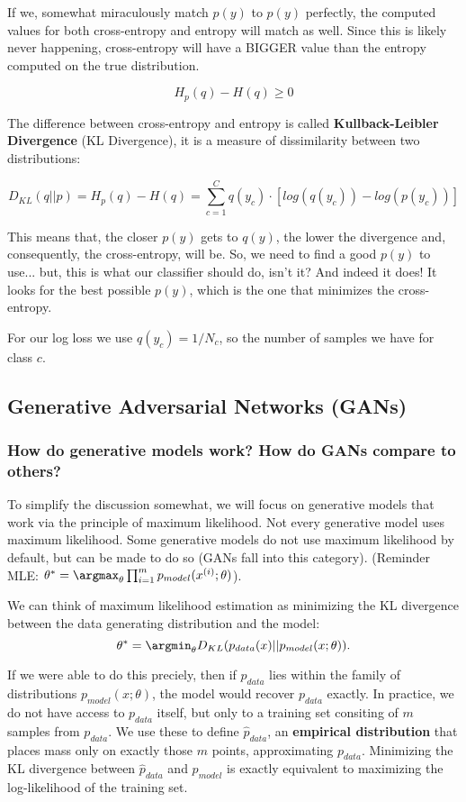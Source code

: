 If we, somewhat miraculously match $p(y)$ to $p(y)$ perfectly, the computed values for both cross-entropy and entropy will match as well. Since this is likely never happening, cross-entropy will have a BIGGER value than the entropy computed on the true distribution.

$$H_p(q) - H(q) \geq 0$$

The difference between cross-entropy and entropy is called \textbf{Kullback-Leibler Divergence} (KL Divergence), it is a measure of dissimilarity between two distributions:

$$D_{KL}(q||p) = H_p(q) - H(q) = \sum_{c=1}^C q(y_c) \cdot [log(q(y_c)) - log(p(y_c))]$$

This means that, the closer $p(y)$ gets to $q(y)$, the lower the divergence and, consequently, the cross-entropy, will be. So, we need to find a good $p(y)$ to use... but, this is what our classifier should do, isn't it? And indeed it does! It looks for the best possible $p(y)$, which is the one that minimizes the cross-entropy.

For our log loss we use $q(y_c) = 1/N_c$, so the number of samples we have for class $c$.

\subsection[Generative Adversarial Networks (GANs)]{Generative Adversarial Networks (GANs) \cite{goodfellow2016nips}}
\subsubsection{How do generative models work? How do GANs compare to others?}
To simplify the discussion somewhat, we will focus on generative models that
work via the principle of maximum likelihood. Not every generative model
uses maximum likelihood. Some generative models do not use maximum likelihood by default, but can be made to do so (GANs fall into this category). (Reminder MLE: $\theta^* = \argmax_{\theta} \prod_{i=1}^m p_{model}(x^{(i)}; \theta)$).

We can think of maximum likelihood estimation as minimizing the KL divergence between the data generating distribution and the model: $$\theta^* = \argmin_{\theta} D_{KL}(p_{data}(x)||p_{model}(x;\theta)).$$

If we were able to do this preciely, then if $p_{data}$ lies within the family of distributions $p_{model}(x; \theta)$, the model would recover $p_{data}$ exactly. In practice, we do not have access to $p_{data}$ itself, but only to a training set consiting of $m$ samples from $p_{data}$. We use these to define $\hat{p}_{data}$, an \textbf{empirical distribution} that places mass only on exactly those $m$ points, approximating $p_{data}$. Minimizing the KL divergence between $\hat{p}_{data}$ and $p_{model}$ is exactly equivalent to maximizing the log-likelihood of the training set.

